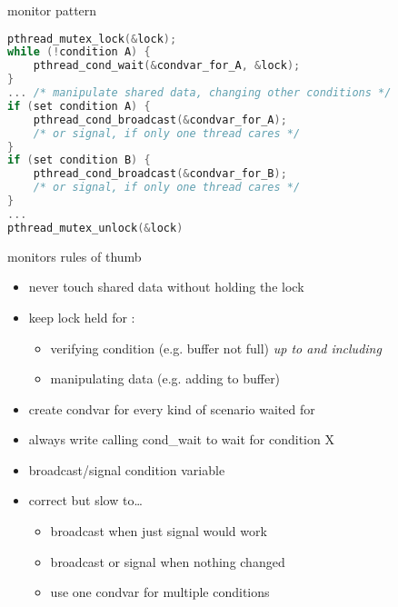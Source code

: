 \begin{frame}[fragile,label=monitorPattern]{monitor pattern}
\begin{lstlisting}[language=C++,style=small]
pthread_mutex_lock(&lock);
while (!condition A) {
    pthread_cond_wait(&condvar_for_A, &lock);
}
... /* manipulate shared data, changing other conditions */
if (set condition A) {
    pthread_cond_broadcast(&condvar_for_A);
    /* or signal, if only one thread cares */
}
if (set condition B) {
    pthread_cond_broadcast(&condvar_for_B);
    /* or signal, if only one thread cares */
}
...
pthread_mutex_unlock(&lock)
\end{lstlisting}
\end{frame}

\begin{frame}[fragile,label=monitorRulesOfThumb]{monitors rules of thumb}
\begin{itemize}
\item never touch shared data without holding the lock
\item keep lock held for :
    \begin{itemize}
    \item verifying condition (e.g. buffer not full) \textit{up to and including}
    \item manipulating data (e.g. adding to buffer)
    \end{itemize}
\item create condvar for every kind of scenario waited for
\item always write  calling cond\_wait to wait for condition X
\item broadcast/signal condition variable 
\item<2-> correct but slow to\ldots
    \begin{itemize}
    \item broadcast when just signal would work
    \item broadcast or signal when nothing changed
    \item use one condvar for multiple conditions
    \end{itemize}
\end{itemize}
\end{frame}

